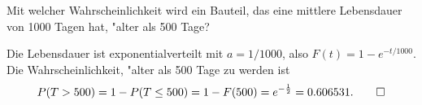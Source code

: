 Mit welcher Wahrscheinlichkeit wird ein Bauteil, das eine mittlere Lebensdauer
von 1000 Tagen hat, "alter als 500 Tage?

\begin{loesung}
Die Lebensdauer ist exponentialverteilt mit $a=1/1000$, also
$F(t)=1-e^{-t/1000}$. Die Wahrscheinlichkeit, "alter als 500 Tage
zu werden ist
\[
P(T > 500)=1-P(T\le 500)=1-F(500)=e^{-\frac12}=0.606531.
\qedhere
\]
\end{loesung}

